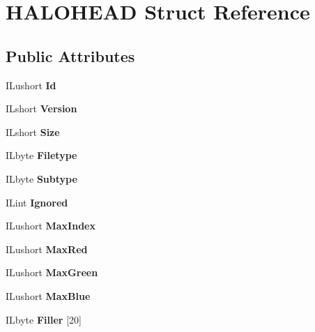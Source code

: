 \hypertarget{structHALOHEAD}{}\section{H\+A\+L\+O\+H\+E\+AD Struct Reference}
\label{structHALOHEAD}
\subsection*{Public Attributes}
\begin{DoxyCompactItemize}
\item 
\mbox{\label{structHALOHEAD_a5abb1131ad880789668d6dc2ab251854}} 
I\+Lushort {\bfseries Id}
\item 
\mbox{\label{structHALOHEAD_a579b6b2eb89e08141df4c918838ceb3b}} 
I\+Lshort {\bfseries Version}
\item 
\mbox{\label{structHALOHEAD_a0d14d830820d9a57800b857988a5ab0a}} 
I\+Lshort {\bfseries Size}
\item 
\mbox{\label{structHALOHEAD_a3f31d78fa620110f5dffc893f1e2e719}} 
I\+Lbyte {\bfseries Filetype}
\item 
\mbox{\label{structHALOHEAD_a69d7dcd5c67665cd2edfc23aa990072a}} 
I\+Lbyte {\bfseries Subtype}
\item 
\mbox{\label{structHALOHEAD_a7df7fd866c0f0bcd8e28182857aa7111}} 
I\+Lint {\bfseries Ignored}
\item 
\mbox{\label{structHALOHEAD_ab67550038f01dd5a2c36ccc0d97fc1d2}} 
I\+Lushort {\bfseries Max\+Index}
\item 
\mbox{\label{structHALOHEAD_a40136139788d2a0bd80477c3cd3ca78c}} 
I\+Lushort {\bfseries Max\+Red}
\item 
\mbox{\label{structHALOHEAD_afae1cd81951836dcb1d80aa8fbbd8083}} 
I\+Lushort {\bfseries Max\+Green}
\item 
\mbox{\label{structHALOHEAD_a10050e890256ba2e1df59ee46767fbcf}} 
I\+Lushort {\bfseries Max\+Blue}
\item 
\mbox{\label{structHALOHEAD_a05580dde11dfe50f3412b928e1f9b7ba}} 
I\+Lbyte {\bfseries Filler} \mbox{[}20\mbox{]}
\end{DoxyCompactItemize}


